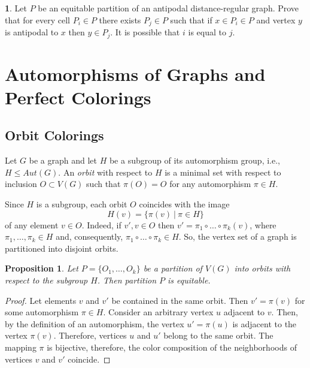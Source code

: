 \documentclass[11pt]{article}
\newtheorem{claim}{Proposition}[section]
\theoremstyle{definition}
\newtheorem{exercise}{\quad}
\begin{document}
{{\begin{exercise}
Let $P$ be  an equitable partition of an antipodal distance-regular graph. Prove that for every cell  $P_i\in P$ there exists $P_j\in P$ such that  if $x\in P_i\in P$ and vertex $y$ is antipodal to $x$ then $y\in P_j$. It is possible that $i$ is equal to $j$.
\end{exercise}




\section{Automorphisms of Graphs and Perfect Colorings}\label{Orbit}



\subsection{Orbit Colorings}

Let $G$ be a graph and let $H$ be a subgroup of its 
  automorphism group, i.e., $H\leq Aut(G)$.
An {\sl orbit} with respect to $H$ is a minimal set with respect to
inclusion $O\subset V(G)$ such that $\pi (O)=O$ for
any automorphism $\pi \in H$.

Since $H$ is a subgroup, each orbit $O$ coincides with the image
 $$H(v)=\{\pi(v)\
|\ \pi \in H\}$$ of any element $v\in O$. Indeed, if $v',v\in O$ then $v'=\pi_1\circ \dots\circ \pi_k(v)$,  where $\pi_1,\dots,\pi_k\in H$ and, consequently, $\pi_1\circ \dots\circ \pi_k\in H$. So, the vertex set
of a graph is partitioned into disjoint orbits.

\begin{claim}\label{claim:orbit}
Let $P=\{O_1,\dots,O_k\}$ be a partition of  $V(G)$ into orbits
with respect to the subgroup $H$. Then partition $P$ is equitable.
\end{claim}
\begin{proof}
Let elements $v$ and $v'$ be contained in the same orbit. Then $v'=\pi(v)$ for some automorphism $\pi\in
H$.  Consider an arbitrary vertex $u$ adjacent to $v$.
Then, by the definition of an automorphism, the vertex $u'=\pi(u)$ is adjacent to
the vertex $\pi(v)$. Therefore, vertices $u$ and $u'$ belong
to the same orbit. The mapping $\pi$ is bijective,
therefore, the color composition of the neighborhoods of vertices $v$ and $v'$ coincide.
\end{proof}

}}
\end{document}
